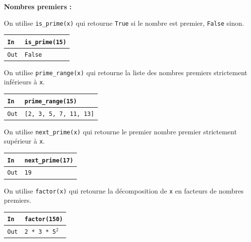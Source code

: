 \documentclass[titlepage]{article}
\begin{document}
    \textbf{Nombres premiers :} \bigbreak
    
    On utilise \texttt{is\_prime(x)} qui retourne \texttt{True} si le nombre est premier, \texttt{False} sinon. \bigbreak

    \begin{tabularx}{12cm}{|p{0.60cm}|X|}
        \hline
        \rowcolor{gray}
        \texttt{In}
        & 
        \texttt{is\_prime(15)}
        \\
        \hline
        \texttt{Out}
        &
        \texttt{False}
        \\
        \hline
    \end{tabularx}
    \bigbreak

    On utilise \texttt{prime\_range(x)} qui retourne la liste des nombres premiers strictement inférieurs à \texttt{x}. \bigbreak

    \begin{tabularx}{12cm}{|p{0.60cm}|X|}
        \hline
        \rowcolor{gray}
        \texttt{In}
        & 
        \texttt{prime\_range(15)}
        \\
        \hline
        \texttt{Out}
        &
        \texttt{[2, 3, 5, 7, 11, 13]}
        \\
        \hline
    \end{tabularx}
    \bigbreak

    On utilise \texttt{next\_prime(x)} qui retourne le premier nombre premier strictement supérieur à \texttt{x}. \bigbreak

    \begin{tabularx}{12cm}{|p{0.60cm}|X|}
        \hline
        \rowcolor{gray}
        \texttt{In}
        & 
        \texttt{next\_prime(17)}
        \\
        \hline
        \texttt{Out}
        &
        \texttt{19}
        \\
        \hline
    \end{tabularx}
    \bigbreak

    On utilise \texttt{factor(x)} qui retourne la décomposition de \texttt{x} en facteurs de nombres premiers. \bigbreak

    \begin{tabularx}{12cm}{|p{0.60cm}|X|}
        \hline
        \rowcolor{gray}
        \texttt{In}
        & 
        \texttt{factor(150)}
        \\
        \hline
        \texttt{Out}
        &
        \texttt{2 * 3 * 5$^ 2$ }
        \\
        \hline
    \end{tabularx}
    \bigbreak
\end{document}
